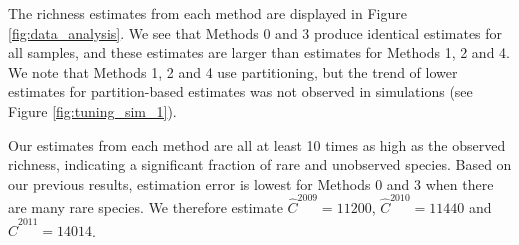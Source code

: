 \documentclass[oupdraft]{bio}
\begin{document}



The richness estimates from each method are displayed in Figure \ref{fig:data_analysis}.  We see that Methods 0 and 3 produce identical estimates for all samples, and these estimates are larger than estimates for Methods 1, 2 and 4. We note that Methods 1, 2 and 4 use partitioning, but the trend of lower estimates for partition-based estimates was not observed in simulations (see Figure \ref{fig:tuning_sim_1}).



Our estimates from each method are all at least 10 times as high as the observed richness, indicating a significant fraction of rare and unobserved species. Based on our previous results, estimation error is lowest for Methods 0 and 3 when there are many rare species. We therefore estimate $\widehat{C}^{2009} = 11200$, $\widehat{C}^{2010} = 11440$ and $\widehat{C}^{2011} = 14014$.
\end{document}
